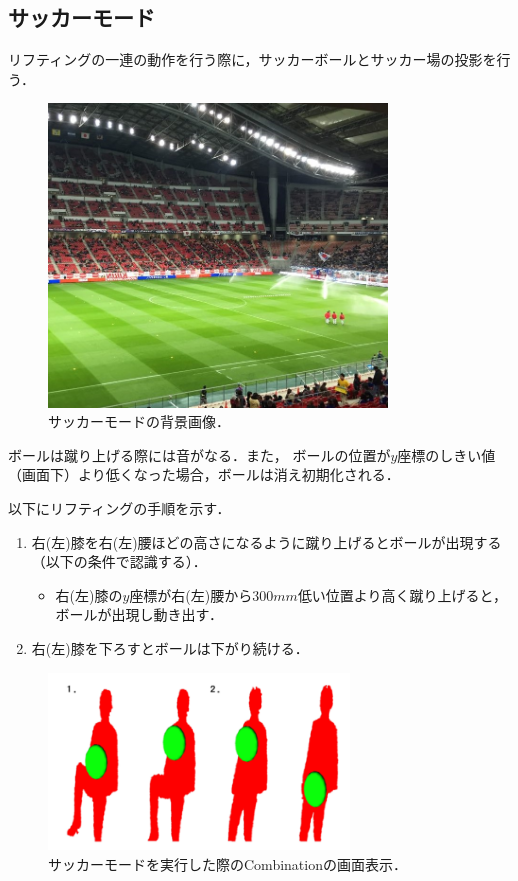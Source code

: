 \clearpage

\subsection{サッカーモード}
リフティングの一連の動作を行う際に，サッカーボールとサッカー場の投影を行う．
\vspace{1cm}
\begin{figure}[h]
    \centering
    \includegraphics[width=9cm]{image/soccer_back.jpg}
    \caption[サッカーモードの背景画像]{サッカーモードの背景画像．}
  \label{soccerback}
\end{figure}
\vspace{1cm}

ボールは蹴り上げる際には音がなる．また，
ボールの位置が$y$座標のしきい値（画面下）より低くなった場合，ボールは消え初期化される．


\clearpage
以下にリフティングの手順を示す．

\begin{enumerate}
    \item 右(左)膝を右(左)腰ほどの高さになるように蹴り上げるとボールが出現する（以下の条件で認識する）．
        \begin{itemize}
            \item 右(左)膝の$y$座標が右(左)腰から$300mm$低い位置より高く蹴り上げると，ボールが出現し動き出す．            
        \end{itemize}
    \item 右(左)膝を下ろすとボールは下がり続ける．
\end{enumerate}

\vspace{1cm}
\begin{figure}[h]
    \centering
    \includegraphics[width=8cm]{image/soccer.png}
    \caption[サッカーモードを実行した際のCombinationの画面表示]{サッカーモードを実行した際のCombinationの画面表示．}
  \label{baseball}
\end{figure}


